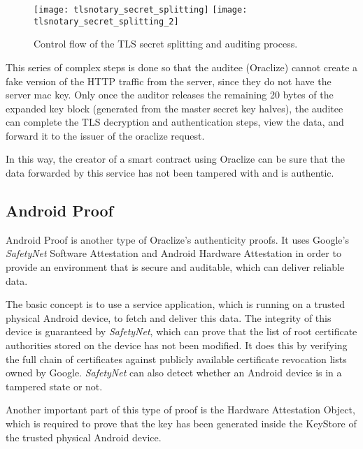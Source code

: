 \begin{figure}[H]
\texttt{[image: tlsnotary\_secret\_splitting]}
\texttt{[image: tlsnotary\_secret\_splitting\_2]}
\caption{Control flow of the TLS secret splitting and auditing process. \cite{tlsnotarywhitepaper}}
\end{figure}

This series of complex steps is done so that the auditee (Oraclize) cannot create a fake version of the HTTP traffic from the server, since they do not have the server mac key. Only once the auditor releases the remaining 20 bytes of the expanded key block (generated from the master secret key halves), the auditee can complete the TLS decryption and authentication steps, view the data, and forward it to the issuer of the oraclize request. 

In this way, the creator of a smart contract using Oraclize can be sure that the data forwarded by this service has not been tampered with and is authentic.

\newpage

\subsection*{Android Proof}
Android Proof is another type of Oraclize's authenticity proofs. It uses Google's \emph{SafetyNet} Software Attestation and Android Hardware Attestation in order to provide an environment that is secure and auditable, which can deliver reliable data.

The basic concept is to use a service application, which is running on a trusted physical Android device, to fetch and deliver this data. The integrity of this device is guaranteed by \emph{SafetyNet}, which can prove that the list of root certificate authorities stored on the device has not been modified. It does this by verifying the full chain of certificates against publicly available certificate revocation lists owned by Google. \emph{SafetyNet} can also detect whether an Android device is in a tampered state or not.

Another important part of this type of proof is the Hardware Attestation Object, which is required to prove that the key has been generated inside the KeyStore of the trusted physical Android device.

